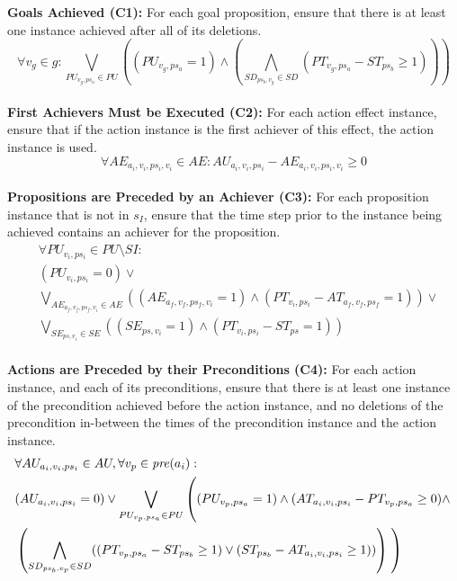 \textbf{Goals Achieved (C1):} For each goal proposition, ensure that there is at least one instance achieved after all of its deletions.
\[\forall v_g\in g:\bigvee_{PU_{v_g,ps_a}\in PU}\left((PU_{v_g,ps_a}=1)\wedge\left(\bigwedge_{SD_{ps_b,v_g}\in SD}(PT_{v_g,ps_a}-ST_{ps_b}\geq 1)\right)\right)\]\\


\textbf{First Achievers Must be Executed (C2):} For each action effect instance, ensure that if the action instance is the first achiever of this effect, the action instance is used.
\[ \forall AE_{a_i,v_i,ps_i,v_i}\in AE: AU_{a_i,v_i,ps_i}-AE_{a_i,v_i,ps_i,v_i}\geq 0\]\\


\textbf{Propositions are Preceded by an Achiever (C3):} For each proposition instance that is not in $s_I$, ensure that the time step prior to the instance being achieved contains an achiever for the proposition.
\begin{align*}
&\forall PU_{v_i,ps_i}\in PU\setminus SI:\\
&(PU_{v_i,ps_i}=0)\vee\\
&\bigvee_{AE_{a_f,v_f,ps_f,v_i}\in AE}((AE_{a_f,v_f,ps_f,v_i}=1)\wedge (PT_{v_i,ps_i}-AT_{a_f,v_f,ps_f}=1))\vee\\
&\bigvee_{SE_{ps,v_i}\in SE}((SE_{ps,v_i}=1)\wedge (PT_{v_i,ps_i}-ST_{ps}=1))
\end{align*}\\


\textbf{Actions are Preceded by their Preconditions (C4):} For each action instance, and each of its preconditions, ensure that there is at least one instance of the precondition achieved before the action instance, and no deletions of the precondition in-between the times of the precondition instance and the action instance.
\begin{align*}
&\forall AU_{a_i,v_i,ps_i}\in AU, \forall v_p\in\Pre (a_i):\\
&(AU_{a_i,v_i,ps_i}=0)\vee\bigvee_{PU_{v_p,ps_a}\in PU}\left(\vphantom{\bigwedge_{SD_{ps_b,v_p}\in SD}}(PU_{v_p,ps_a}=1)\wedge (AT_{a_i,v_i,ps_i}-PT_{v_p,ps_a}\geq 0)\wedge\right.\\
&\left(\bigwedge_{SD_{ps_b,v_p}\in SD}((PT_{v_p,ps_a}-ST_{ps_b}\geq 1)\vee(ST_{ps_b}-AT_{a_i,v_i,ps_i}\geq 1))\right)\left.\vphantom{\bigwedge_{SD_{ps_b,v_p}\in SD}}\right)
\end{align*}\\


